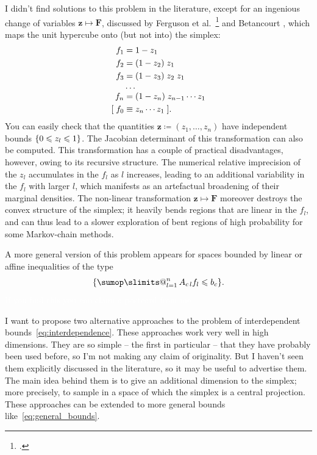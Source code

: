 \documentclass[\ifafour a4paper,12pt,\else a5paper,10pt,\fi%
onecolumn,oneside,article,%
british%
]{memoir}
\makeatletter
\theoremstyle{remark}
\theoremstyle{innote}
\def\sum{\DOTSI\sumop\slimits@}
\let\parentext=\parentexttrack%
\newcommand*{\citep}{\footcites}
\newcommand*{\citey}{\footcites}%
\newcommand*{\defd}{\coloneqq}
\renewcommand*{\le}{\leqslant}%
\DeclarePairedDelimiter\set{\{}{\}}
\renewcommand*{\|}[1][]{\nonscript\,#1\vert\nonscript\;\mathopen{}}
\newcommand*{\sect}{\S}%
\newcommand*{\etal}{{et al.}}
\newcommand*{\tsum}{\mathop{\textstyle\sum}\nolimits}
\newcommand*{\yff}{f}
\newcommand*{\yfi}{\bm{F}}
\newcommand*{\yxx}{z}
\newcommand*{\yx}{\bm{\yxx}}
\makeatother
\begin{document}
I didn't find solutions to this problem in the literature, except for an
ingenious change of variables $\yx \mapsto \yfi$, discussed by Ferguson
\etal\ \citey{fergusonetal1992} and Betancourt
\parentext{\cite*{betancourt2012}; \cite{altmannetal2014}}, which maps the
unit hypercube onto (but not into) the simplex:
\begin{equation}
  \label{eq:betancourt_transf}
  \begin{split}
  \yff_{1} &= 1- \yxx_{1} \\
  \yff_{2} &= (1- \yxx_{2})\;\yxx_{1} \\
  \yff_{3} &= (1- \yxx_{3})\;\yxx_{2} \;\yxx_{1} \\[-\jot]
  &\dotso \\[-\jot]
  \yff_{n} &= (1- \yxx_{n})\;\yxx_{n-1} \dotsm \yxx_{1}\\
  [\; \yff_{0}&\equiv \yxx_{n} \dotsm \yxx_{1} \;].
\end{split}
\end{equation}
You can easily check that the quantities
$\yx \defd (\yxx_{1},\dotsc,\yxx_{n})$ have independent bounds
$\set{0 \le \yxx_{l} \le 1}$. The Jacobian determinant of this
transformation can also be computed. This transformation has a couple of
practical disadvantages, however, owing to its recursive structure. The
numerical relative imprecision of the $\yxx_{l}$ accumulates in the
$\yff_{l}$ as $l$ increases, leading to an additional
variability in the $\yff_{l}$ with larger $l$, which manifests as an
artefactual broadening of their marginal densities. The non-linear
transformation $\yx \mapsto \yfi$ moreover destroys the convex structure of
the simplex; it heavily bends regions that are linear in the $\yff_{l}$, and can
thus lead to a slower exploration of bent regions of high probability for some
Markov-chain methods.

A more general version of this problem appears for spaces bounded by linear
or affine inequalities of the type
\begin{equation}
\set{\tsum_{l=1}^{n}A_{c\,l}\yff_{l} \le b_{c}}.\label{eq:general_bounds}
\end{equation}
\textcolor{white}{If you
  find this you can claim a postcard from me.}


I want to propose two alternative approaches to the problem of
interdependent bounds~\eqref{eq:interdependence}. These approaches work
very well in high dimensions. They are so simple -- the first in particular
-- that they have probably been used
before, %
so I'm not making any claim of originality. But I haven't seen them
explicitly discussed in the literature, so it may be useful to advertise
them. The main idea behind them is to give an additional dimension to the
simplex; more precisely, to sample in a space of which the simplex is a
central projection. These approaches can be extended to more general bounds
like~\eqref{eq:general_bounds}.
\end{document}
